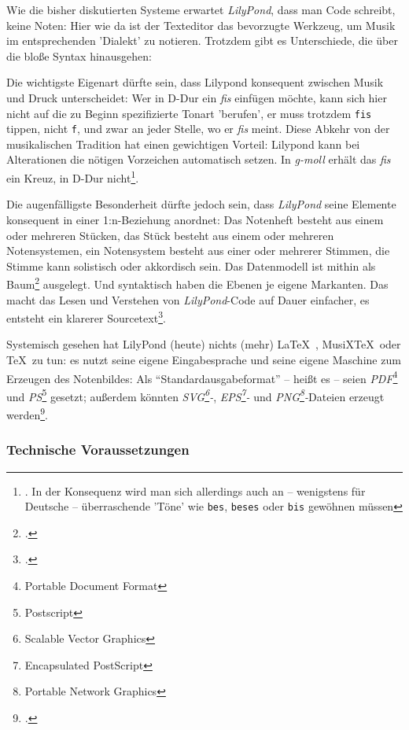 Wie die bisher diskutierten Systeme erwartet \emph{LilyPond}, dass man Code
schreibt, keine Noten: Hier wie da ist der Texteditor das bevorzugte Werkzeug,
um Musik im entsprechenden 'Dialekt' zu notieren. Trotzdem gibt es Unterschiede,
die über die bloße Syntax hinausgehen:

Die wichtigste Eigenart dürfte sein, dass Lilypond konsequent zwischen Musik und
Druck unterscheidet: Wer in D-Dur ein \emph{fis} einfügen möchte, kann sich hier
nicht auf die zu Beginn spezifizierte Tonart 'berufen', er muss trotzdem
\texttt{fis} tippen, nicht \texttt{f}, und zwar an jeder Stelle, wo er
\emph{fis} meint. Diese Abkehr von der musikalischen Tradition hat einen
gewichtigen Vorteil: Lilypond kann bei Alterationen die nötigen Vorzeichen
automatisch setzen. In \emph{g-moll} erhält das \emph{fis} ein Kreuz, in D-Dur
nicht\footnote{\cite[vgl.][21]{LilyPond2018b}. In der Konsequenz wird man sich
allerdings auch an -- wenigstens für Deutsche -- überraschende 'Töne' wie
\texttt{bes}, \texttt{beses} oder \texttt{bis} gewöhnen müssen}.

Die augenfälligste Besonderheit dürfte jedoch sein, dass \emph{LilyPond} seine
Elemente konsequent in einer 1:n-Beziehung anordnet: Das Notenheft besteht aus
einem oder mehreren Stücken, das Stück besteht aus einem oder mehreren
Notensystemen, ein Notensystem besteht aus einer oder mehrerer Stimmen, die
Stimme kann solistisch oder akkordisch sein. Das Datenmodell ist mithin als
Baum\footcite[vgl.][\nopage wp.]{WpedBaum2019a} ausgelegt. Und syntaktisch haben
die Ebenen je eigene Markanten. Das macht das Lesen und Verstehen von
\emph{LilyPond}-Code auf Dauer einfacher, es entsteht ein klarerer
Sourcetext\footcite[vgl.][40ff]{LilyPond2018b}.

Systemisch gesehen hat LilyPond (heute) nichts (mehr) \LaTeX\ , MusiX\TeX\ oder
\TeX\ zu tun: es nutzt seine eigene Eingabesprache und seine eigene Maschine zum
Erzeugen des Notenbildes: Als \enquote{Standardausgabeformat} -- heißt es --
seien \emph{PDF}\footnote{Portable Document Format} und
\emph{PS}\footnote{Postscript} gesetzt; außerdem könnten
\emph{SVG\footnote{Scalable Vector Graphics}-}, \emph{EPS\footnote{Encapsulated
PostScript}-} und \emph{PNG\footnote{Portable Network Graphics}-}Dateien erzeugt
werden\footcite[vgl.][481]{LilyPond2018c}.

\subsubsection{Technische Voraussetzungen}

